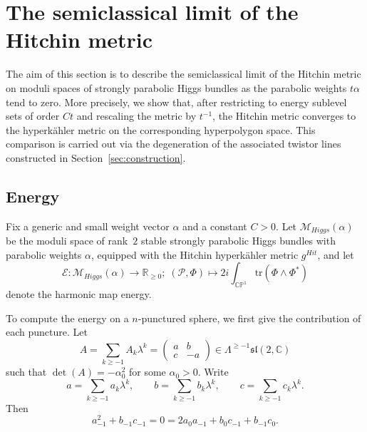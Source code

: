\documentclass[12pt,a4paper]{amsart}
\newtheorem{theorem}{Theorem}[section]
\theoremstyle{definition}
\theoremstyle{remark}
\newcommand{\R}{\mathbb R}
\newcommand{\C}{\mathbb C}
\newcommand{\CP}{\mathbb{CP}}
\newcommand{\tr}{\mathrm{tr}}
\newcommand{\Pcal}{\mathcal P}
\begin{document}



\section{The semiclassical limit of the Hitchin metric}\label{sec:scl}
The aim of this section is to describe the semiclassical limit of the Hitchin
metric on moduli spaces of strongly parabolic Higgs bundles as the
parabolic weights $t\alpha$ tend to zero.
More precisely, we show that, after restricting to energy sublevel sets of order
$Ct$ and rescaling the metric by $t^{-1}$, the Hitchin metric converges to the
hyperk\"ahler metric on the corresponding hyperpolygon space.
This comparison is carried out via the degeneration of the associated twistor
lines constructed in Section~\ref{sec:construction}.

\subsection{Energy}

Fix a generic and small weight vector $\alpha$ and a constant $C>0$.
Let $\mathcal M_{Higgs}(\alpha)$ be the moduli space of rank~$2$
stable strongly parabolic Higgs bundles with parabolic weights $\alpha$, equipped
with the Hitchin hyperk\"ahler metric $g^{Hit}$, and let
\[
\mathcal E \colon \mathcal M_{Higgs}(\alpha)\to\R_{\ge 0};\; (\mathcal P,\Phi)\mapsto2i\int_{\CP^1}\tr(\Phi\wedge\Phi^*)
\]
denote the harmonic map energy.

To compute the energy on a $n$-punctured sphere, we first give the contribution of each puncture. Let
\[
A=\sum_{k\geq-1}A_k\lambda^k
=
\begin{pmatrix}
a & b \\
c & -a
\end{pmatrix}
\in\Lambda^{\geq-1}\mathfrak{sl}(2,\C)
\]
 such that $\det(A)=-\alpha_0^2$ for some $\alpha_0>0$.
Write
\[
a=\sum_{k\geq-1} a_k\lambda^k,\qquad
b=\sum_{k\geq-1} b_k\lambda^k,\qquad
c=\sum_{k\geq-1} c_k\lambda^k.
\]
Then
\begin{equation}\label{eq:detcon}
a_{-1}^2+b_{-1}c_{-1}
=
0
=
2 a_0 a_{-1}+b_0 c_{-1}+b_{-1}c_0.
\end{equation}
\end{document}
